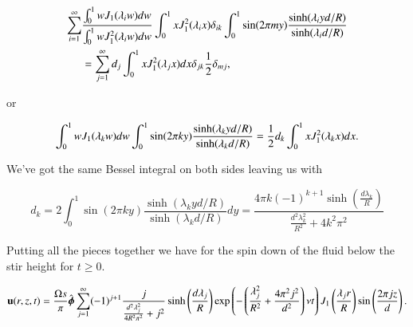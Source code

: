 %
\begin{equation}\label{eqn:coffeeCupWithBottom:960}
\begin{aligned}
\sum_{i=1}^\infty
&\frac{
\int_0^1 w J_1 (\lambda_i w) dw
}{
\int_0^1 w J_1^2 (\lambda_i w) dw
}
\int_0^1 x J_1^2(\lambda_i x) \delta_{i k} \int_0^1 \sin( 2 \pi m y ) \frac{\sinh(\lambda_i y d/R)}{\sinh(\lambda_i d/R) } \\
&=
\sum_{j = 1}^\infty d_j \int_0^1 x J_1^2(\lambda_j x) dx \delta_{j k} \frac{1}{2} \delta_{m j},
\end{aligned}
\end{equation}

or

\begin{equation}\label{eqn:coffeeCupWithBottom:980}
\int_0^1 w J_1 (\lambda_k w) dw
\int_0^1 \sin( 2 \pi k y ) \frac{\sinh(\lambda_k y d/R)}{\sinh(\lambda_k d/R) }
=
\frac{1}{2} d_k \int_0^1 x J_1^2(\lambda_k x) dx.
\end{equation}

We've got the same Bessel integral on both sides leaving us with

\begin{equation}\label{eqn:coffeeCupWithBottom:1000}
d_k = 2 \int_0^1 \sin( 2 \pi k y ) \frac{\sinh(\lambda_k y d/R)}{\sinh(\lambda_k d/R) } dy
=
\frac{4 \pi k (-1)^{k+1} \sinh \left(\frac{d \lambda_k}{R}\right)}{\frac{d^2 \lambda_k^2}{R^2} + 4 k^2 \pi^2}
\end{equation}

Putting all the pieces together we have for the spin down of the fluid below the stir height for $t \ge 0$.

\begin{dmath}\label{eqn:coffeeCupWithBottom:1020}
\Bu(r, z, t) 
= 
\frac{\Omega s}{\pi} \phicap \sum_{j = 1}^\infty 
(-1)^{j+1}
\frac{j }{\frac{d^2 \lambda_j^2 }{4 R^2 \pi^2}+ j^2}
\sinh \left(\frac{d \lambda_j}{R}\right)
\exp\left( -\left( \frac{\lambda_j^2}{R^2} + \frac{4 \pi^2 j^2}{d^2} \right) \nu t\right)
J_1 \left(\frac{\lambda_j r}{R}\right) 
\sin\left( \frac{2 \pi j z}{d} \right) 
.
\end{dmath}

